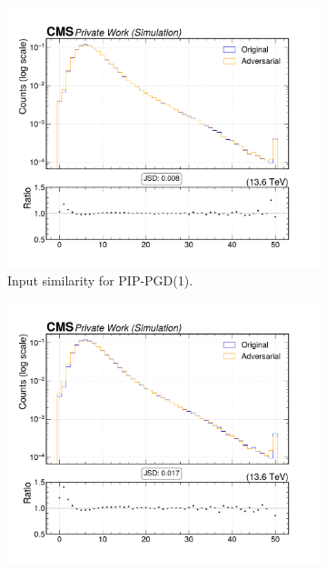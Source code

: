 \begin{figure}[htbp]
  \centering
  \begin{subfigure}[t]{0.32\textwidth}
    \includegraphics[width=\linewidth]{media/output/features/compare/combined_it_1/cmp_global_features_n_Cpfcand.pdf}
    \caption*{Input similarity for PIP-PGD(1).}
  \end{subfigure}\hfill
  \begin{subfigure}[t]{0.32\textwidth}
    \includegraphics[width=\linewidth]{media/output/features/compare/combined_it_2/cmp_global_features_n_Cpfcand.pdf}

\end{subfigure}
\end{figure}
